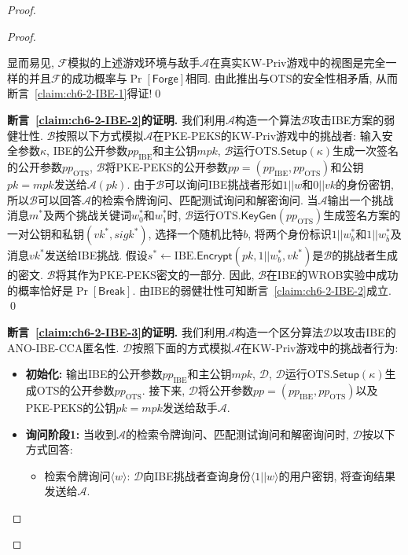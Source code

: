 \begin{proof}
\begin{proof}
\begin{trivlist}
显而易见, $\mathcal{F}$模拟的上述游戏环境与敌手$\mathcal{A}$在真实KW-Priv游戏中的视图是完全一样的并且$\mathcal{F}$的成功概率与$\Pr[\mathsf{Forge}]$相同. 由此推出与OTS的安全性相矛盾, 从而断言~\ref{claim:ch6-2-IBE-1}得证!\qed 
\end{trivlist}

\begin{trivlist}
	\item \textbf{断言~\ref{claim:ch6-2-IBE-2}的证明.} 我们利用$\mathcal{A}$构造一个算法$\mathcal{B}$攻击IBE方案的弱健壮性. $\mathcal{B}$按照以下方式模拟$\mathcal{A}$在PKE-PEKS的KW-Priv游戏中的挑战者:
输入安全参数$\kappa$, IBE的公开参数$pp_{\text{IBE}}$和主公钥$mpk$, $\mathcal{B}$运行$\text{OTS}.\mathsf{Setup}(\kappa)$生成一次签名的公开参数$pp_{\text{OTS}}$, $\mathcal{B}$将PKE-PEKS的公开参数$pp = (pp_{\text{IBE}}, pp_{\text{OTS}})$和公钥$pk = mpk$发送给$\mathcal{A}(pk)$. 由于$\mathcal{B}$可以询问IBE挑战者形如$1||w$和$0||vk$的身份密钥, 所以$\mathcal{B}$可以回答$\mathcal{A}$的检索令牌询问、匹配测试询问和解密询问. 当$\mathcal{A}$输出一个挑战消息$m^*$及两个挑战关键词$w_0^*$和$w_1^*$时, $\mathcal{B}$运行$\text{OTS}.\mathsf{KeyGen}(pp_{\text{OTS}})$生成签名方案的一对公钥和私钥$(vk^*, sigk^*)$, 选择一个随机比特$b$, 将两个身份标识$1||w_b^*$和$1||w_{\bar{b}}^*$及消息$vk^*$发送给IBE挑战. 假设$s^* \leftarrow \text{IBE}.\mathsf{Encrypt}(pk, 1||w_b^*, vk^*)$是$\mathcal{B}$的挑战者生成的密文. $\mathcal{B}$将其作为PKE-PEKS密文的一部分. 因此, $\mathcal{B}$在IBE的WROB实验中成功的概率恰好是$\Pr[\mathsf{Break}]$. 由IBE的弱健壮性可知断言~\ref{claim:ch6-2-IBE-2}成立. \qed
\end{trivlist}


\begin{trivlist}\itemsep 1pt \parskip 0pt \parsep 0pt
\item \textbf{断言~\ref{claim:ch6-2-IBE-3}的证明.} 我们利用$\mathcal{A}$构造一个区分算法$\mathcal{D}$以攻击IBE的ANO-IBE-CCA匿名性. $\mathcal{D}$按照下面的方式模拟$\mathcal{A}$在KW-Priv游戏中的挑战者行为: 
\begin{itemize}
	\item \textbf{初始化:} 输出IBE的公开参数$pp_{\text{IBE}}$和主公钥$mpk$, $\mathcal{D}$, $\mathcal{D}$运行$\text{OTS}.\mathsf{Setup}(\kappa)$生成OTS的公开参数$pp_{\text{OTS}}$. 接下来, $\mathcal{D}$将公开参数$pp = (pp_{\text{IBE}}, pp_{\text{OTS}})$以及PKE-PEKS的公钥$pk = mpk$发送给敌手$\mathcal{A}$.

	\item \textbf{询问阶段1:} 当收到$\mathcal{A}$的检索令牌询问、匹配测试询问和解密询问时, $\mathcal{D}$按以下方式回答: \vspace{-0.5em}
		\begin{itemize} \itemsep 1pt \parskip 0pt \parsep 0pt
			\item 检索令牌询问$\langle w \rangle$: $\mathcal{D}$向IBE挑战者查询身份$\langle 1||w \rangle$的用户密钥, 将查询结果发送给$\mathcal{A}$.


\end{itemize}
\end{itemize}
\end{trivlist}
\end{proof}
\end{proof}
